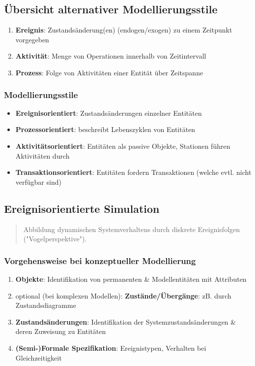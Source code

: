 \documentclass{article}
\begin{document}
\subsection{Übersicht alternativer Modellierungsstile}
\begin{enumerate}
  \item \textbf{Ereignis}: Zustandsänderung(en) (endogen/exogen) zu einem Zeitpunkt vorgegeben
  \item \textbf{Aktivität}: Menge von Operationen innerhalb von Zeitintervall
  \item \textbf{Prozess}: Folge von Aktivitäten einer Entität über Zeitspanne
\end{enumerate}

\subsubsection{Modellierungsstile}
\begin{itemize}
  \item \textbf{Ereignisorientiert}: Zustandsänderungen einzelner Entitäten
  \item \textbf{Prozessorientiert}: beschreibt Lebenszyklen von Entitäten
  \item \textbf{Aktivitätsorientiert}: Entitäten als passive Objekte, Stationen führen Aktivitäten durch
  \item \textbf{Transaktionsorientiert}: Entitäten fordern Transaktionen (welche evtl. nicht verfügbar sind)
\end{itemize}

\subsection{Ereignisorientierte Simulation}
\begin{quote}Abbildung dynamischen Systemverhaltens durch diskrete Ereignisfolgen ("Vogelperspektive").\end{quote}

\subsubsection{Vorgehensweise bei konzeptueller Modellierung}
\begin{enumerate}
  \item \textbf{Objekte}: Identifikation von permanenten \& Modellentitäten mit Attributen
  \item optional (bei komplexen Modellen): \textbf{Zustände/Übergänge}: zB. durch Zustandsdiagramme
  \item \textbf{Zustandsänderungen}: Identifikation der Systemzustandsänderungen \& deren Zuweisung zu Entitäten
  \item \textbf{(Semi-)Formale Spezifikation}: Ereignistypen, Verhalten bei Gleichzeitigkeit
\end{enumerate}
\end{document}
